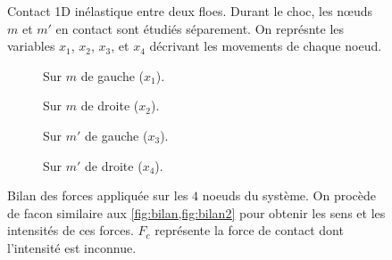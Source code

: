 \begin{figure}[!h]
    \centering
    \caption{Contact 1D inélastique entre deux floes. Durant le choc, les nœuds $m$ et $m'$ en contact sont étudiés séparement. On représnte les variables $x_1$, $x_2$, $x_3$, et $x_4$ décrivant les movements de chaque noeud.}
    \label{fig:contact1d3}
\end{figure}


\begin{figure}[!h]
    \begin{subfigure}[b]{0.30\textwidth}
        \centering
        \caption{Sur $m$ de gauche ($x_1$).}
        \label{fig:bilan13}
    \end{subfigure}
    \begin{subfigure}[b]{0.35\textwidth}
        \centering
        \caption{Sur $m$ de droite ($x_2$).}
        \label{fig:bilan23}
    \end{subfigure}
    \begin{subfigure}[b]{0.35\textwidth}
        \centering
        \caption{Sur $m'$ de gauche ($x_3$).}
        \label{fig:bilan33}
    \end{subfigure}
    \begin{subfigure}[b]{0.30\textwidth}
        \centering
        \caption{Sur $m'$ de droite ($x_4$).}
        \label{fig:bilan43}
    \end{subfigure}
       \caption{Bilan des forces appliquée sur les $4$ noeuds du système. On procède de facon similaire aux \cref{fig:bilan,fig:bilan2} pour obtenir les sens et les intensités de ces forces. $F_c$ représente la force de contact dont l'intensité est inconnue.}
       \label{fig:bilan3}
\end{figure}

